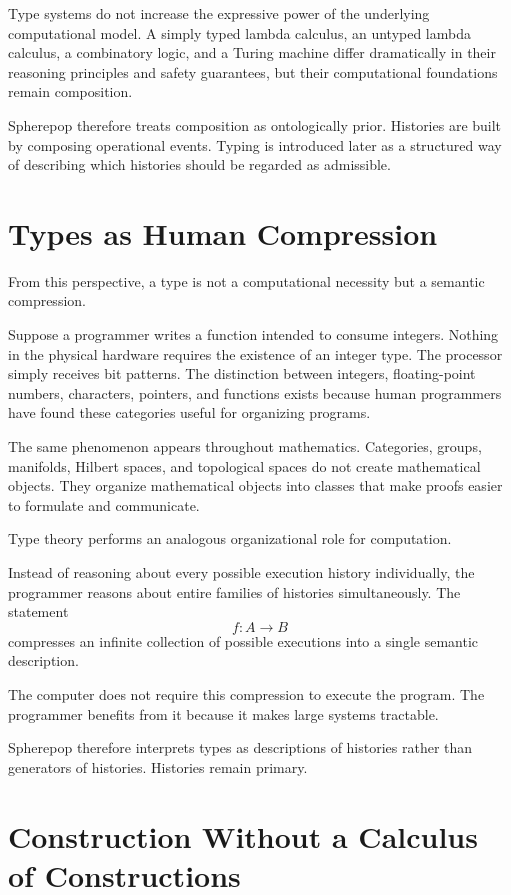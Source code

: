 \documentclass[12pt,oneside]{article}
\begin{document}
Type systems do not increase the expressive power of the underlying computational model. A simply typed lambda calculus, an untyped lambda calculus, a combinatory logic, and a Turing machine differ dramatically in their reasoning principles and safety guarantees, but their computational foundations remain composition.

Spherepop therefore treats composition as ontologically prior. Histories are built by composing operational events. Typing is introduced later as a structured way of describing which histories should be regarded as admissible.

\section{Types as Human Compression}

From this perspective, a type is not a computational necessity but a semantic compression.

Suppose a programmer writes a function intended to consume integers. Nothing in the physical hardware requires the existence of an integer type. The processor simply receives bit patterns. The distinction between integers, floating-point numbers, characters, pointers, and functions exists because human programmers have found these categories useful for organizing programs.

The same phenomenon appears throughout mathematics. Categories, groups, manifolds, Hilbert spaces, and topological spaces do not create mathematical objects. They organize mathematical objects into classes that make proofs easier to formulate and communicate.

Type theory performs an analogous organizational role for computation.

Instead of reasoning about every possible execution history individually, the programmer reasons about entire families of histories simultaneously. The statement
\[
f:A\rightarrow B
\]
compresses an infinite collection of possible executions into a single semantic description.

The computer does not require this compression to execute the program. The programmer benefits from it because it makes large systems tractable.

Spherepop therefore interprets types as descriptions of histories rather than generators of histories. Histories remain primary.

\section{Construction Without a Calculus of Constructions}
\end{document}
